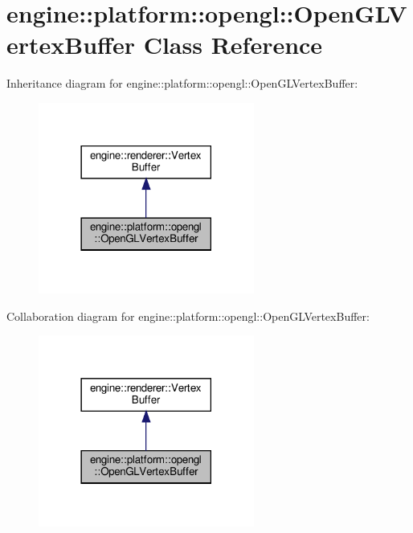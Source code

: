 \hypertarget{classengine_1_1platform_1_1opengl_1_1OpenGLVertexBuffer}{}\section{engine\+:\+:platform\+:\+:opengl\+:\+:Open\+G\+L\+Vertex\+Buffer Class Reference}
\label{classengine_1_1platform_1_1opengl_1_1OpenGLVertexBuffer}


Inheritance diagram for engine\+:\+:platform\+:\+:opengl\+:\+:Open\+G\+L\+Vertex\+Buffer\+:
\nopagebreak
\begin{figure}[H]
\begin{center}
\leavevmode
\includegraphics[width=201pt]{classengine_1_1platform_1_1opengl_1_1OpenGLVertexBuffer__inherit__graph}
\end{center}
\end{figure}


Collaboration diagram for engine\+:\+:platform\+:\+:opengl\+:\+:Open\+G\+L\+Vertex\+Buffer\+:
\nopagebreak
\begin{figure}[H]
\begin{center}
\leavevmode
\includegraphics[width=201pt]{classengine_1_1platform_1_1opengl_1_1OpenGLVertexBuffer__coll__graph}
\end{center}
\end{figure}

